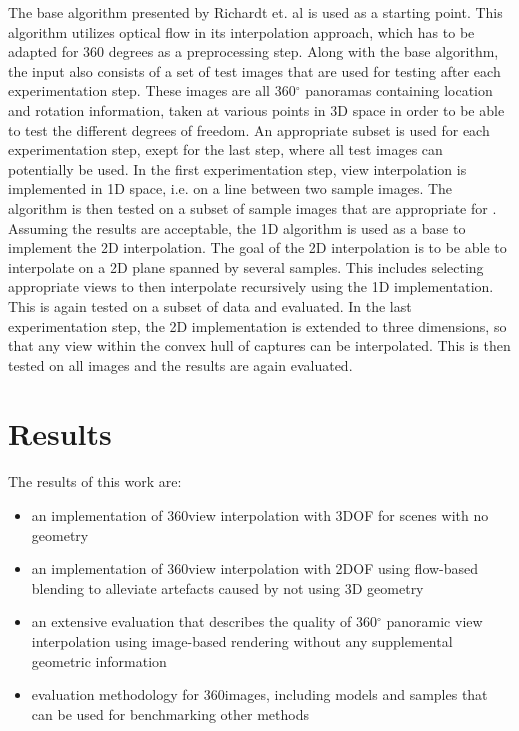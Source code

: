 The base algorithm presented by Richardt et. al \cite{megastereo} is used as a starting point. This algorithm utilizes optical flow in its interpolation approach, which has to be adapted for 360 degrees as a preprocessing step. Along with the base algorithm, the input also consists of a set of test images that are used for testing after each experimentation step. These images are all 360$^{\circ}$ panoramas containing location and rotation information, taken at various points in 3D space in order to be able to test the different degrees of freedom. An appropriate subset is used for each experimentation step, exept for the last step, where all test images can potentially be used.
In the first experimentation step, view interpolation is implemented in 1D space, i.e. on a line between two sample images. The algorithm is then tested on a subset of sample images that are appropriate for . Assuming the results are acceptable, the 1D algorithm is used as a base to implement the 2D interpolation. The goal of the 2D interpolation is to be able to interpolate on a 2D plane spanned by several samples. This includes selecting appropriate views to then interpolate recursively using the 1D implementation. This is again tested on a subset of data and evaluated. In the last experimentation step, the 2D implementation is extended to three dimensions, so that any view within the convex hull of captures can be interpolated. This is then tested on all images and the results are again evaluated.

\section*{Results}

The results of this work are:
\begin{itemize}
\item an implementation of 360\degree view interpolation with 3DOF for scenes with no geometry
\item an implementation of 360\degree view interpolation with 2DOF using flow-based blending to alleviate artefacts caused by not using 3D geometry
\item an extensive evaluation that describes the quality of 360$^{\circ}$ panoramic view interpolation using image-based rendering without any supplemental geometric information
\item evaluation methodology for 360\degree images, including models and samples that can be used for benchmarking other methods
\end{itemize}

